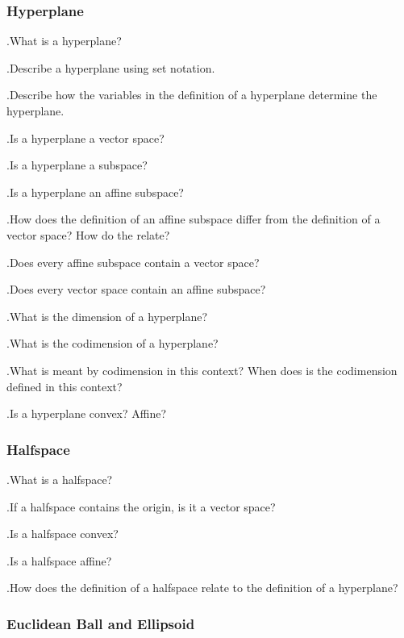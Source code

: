 \documentclass[]{article}
\newcounter{q}
\newcommand{\qnum}{\addtocounter{q}{1}\theq.\quad}
\begin{document}
\subsubsection*{Hyperplane}
\qnum What is a hyperplane? \\
\qnum Describe a hyperplane using set notation. \\
\qnum Describe how the variables in the definition of a hyperplane determine the hyperplane. \\
\qnum Is a hyperplane a vector space? \\
\qnum Is a hyperplane a subspace? \\
\qnum Is a hyperplane an affine subspace? \\
\qnum How does the definition of an affine subspace differ from the definition of a vector space? How do the relate? \\
\qnum Does every affine subspace contain a vector space? \\
\qnum Does every vector space contain an affine subspace? \\
\qnum What is the dimension of a hyperplane? \\
\qnum What is the codimension of a hyperplane? \\
\qnum What is meant by codimension in this context? When does is the codimension defined in this context? \\
\qnum Is a hyperplane convex? Affine? 

\subsubsection*{Halfspace}
\qnum What is a halfspace?\\
\qnum If a halfspace contains the origin, is it a vector space?\\
\qnum Is a halfspace convex?\\
\qnum Is a halfspace affine?\\
\qnum How does the definition of a halfspace relate to the definition of a hyperplane?

\subsubsection*{Euclidean Ball and Ellipsoid}
\end{document}
